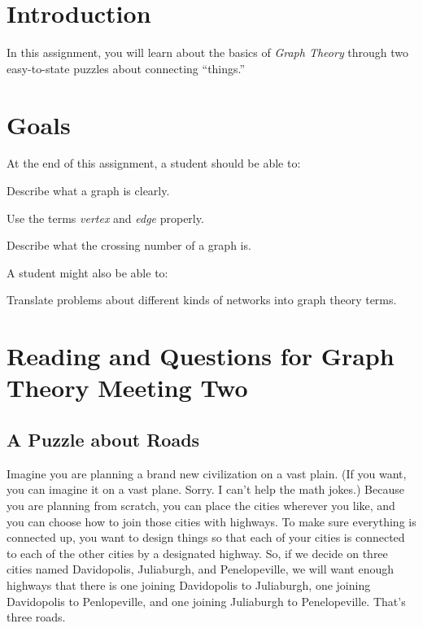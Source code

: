 \documentclass[12pt,letterpaper]{article}
\theoremstyle{definition}
\begin{document}
\setlength{\parskip}{1ex plus 0.5ex minus 0.2ex}
\setlength{\parindent}{0pt}

\pagestyle{fancy}
\cfoot{}

\section*{Introduction}
In this assignment, you will learn about the basics of \emph{Graph Theory}  through two easy-to-state puzzles
about connecting ``things.''

\section*{Goals}
At the end of this assignment, a student should be able to:
\begin{compactitem}
\item Describe what a graph is clearly.
\item Use the terms \emph{vertex} and \emph{edge} properly.
\item Describe what the crossing number of a graph is.
\end{compactitem}
A student might also be able to:
\begin{compactitem}
\item Translate problems about different kinds of networks into graph theory terms.
\end{compactitem}

\section*{Reading and Questions for Graph Theory Meeting Two}

\subsection*{A Puzzle about Roads}

Imagine you are planning a brand new civilization on a vast plain. (If you want, you can imagine it on a vast plane. 
Sorry. I can't help the math jokes.) Because you are planning from scratch, you can place the cities wherever you like, 
and you can choose how to join those cities with highways.   To make sure everything is connected up, you want to design things so that each of your cities is connected to each of 
the other cities by a designated highway. So, if we decide on three cities named Davidopolis, Juliaburgh, and Penelopeville, we will want enough highways that there is one joining Davidopolis to Juliaburgh, one joining Davidopolis to Penlopeville, and one joining Juliaburgh to Penelopeville. That's three roads.
\end{document}
